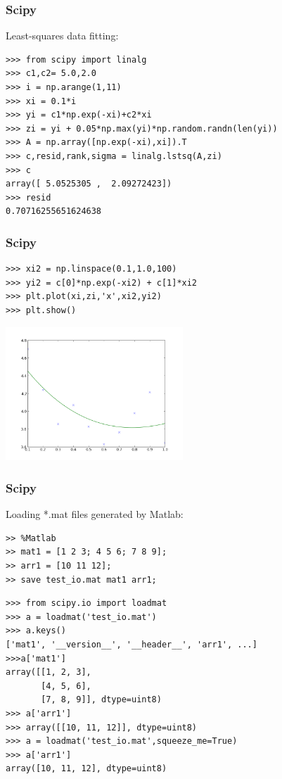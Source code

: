 \begin{frame}[fragile]
\frametitle{Scipy}
Least-squares data fitting:
\begin{myColorBox}{1.0}{}
\begin{verbatim}
>>> from scipy import linalg
>>> c1,c2= 5.0,2.0
>>> i = np.arange(1,11)
>>> xi = 0.1*i
>>> yi = c1*np.exp(-xi)+c2*xi
>>> zi = yi + 0.05*np.max(yi)*np.random.randn(len(yi))
>>> A = np.array([np.exp(-xi),xi]).T
>>> c,resid,rank,sigma = linalg.lstsq(A,zi)
>>> c
array([ 5.0525305 ,  2.09272423])
>>> resid
0.70716255651624638
\end{verbatim}
\end{myColorBox}
\end{frame}

\begin{frame}[fragile]
\frametitle{Scipy}
\begin{myColorBox}{0.9}{}
\begin{verbatim}
>>> xi2 = np.linspace(0.1,1.0,100)
>>> yi2 = c[0]*np.exp(-xi2) + c[1]*xi2
>>> plt.plot(xi,zi,'x',xi2,yi2)
>>> plt.show()\end{verbatim}
\end{myColorBox}
\pause
\begin{center}
      \includegraphics[width=0.5\textwidth]{pix/least_squares_example_1}
\end{center}
\end{frame}

\begin{frame}[fragile]
\frametitle{Scipy}
Loading *.mat files generated by Matlab:
\begin{myColorBox}{1.0}{}
\begin{verbatim}
>> %Matlab
>> mat1 = [1 2 3; 4 5 6; 7 8 9];
>> arr1 = [10 11 12];
>> save test_io.mat mat1 arr1;
\end{verbatim}
\end{myColorBox}
\pause
\begin{myColorBox}{1.0}{}
\begin{verbatim}
>>> from scipy.io import loadmat
>>> a = loadmat('test_io.mat')
>>> a.keys()
['mat1', '__version__', '__header__', 'arr1', ...]
>>>a['mat1']
array([[1, 2, 3],
       [4, 5, 6],
       [7, 8, 9]], dtype=uint8)
>>> a['arr1']
>>> array([[10, 11, 12]], dtype=uint8)
>>> a = loadmat('test_io.mat',squeeze_me=True)
>>> a['arr1']
array([10, 11, 12], dtype=uint8)
\end{verbatim}
\end{myColorBox}
\end{frame}

